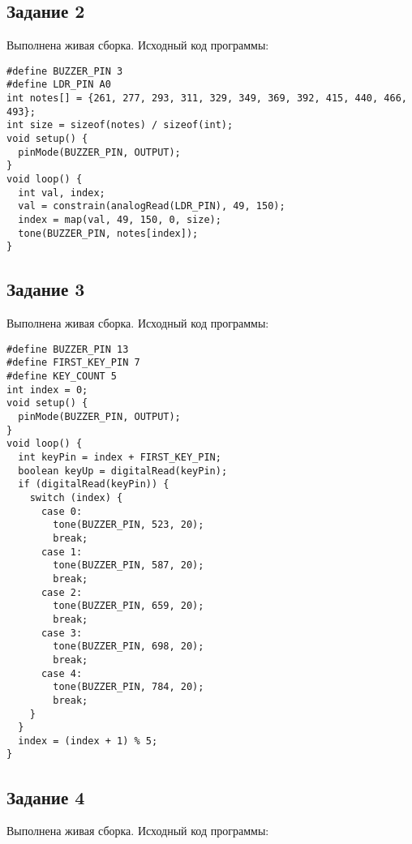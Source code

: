 \documentclass[a4paper,14pt]{extarticle}
\begin{document}
  \subsection*{\hspace{12.5mm}Задание 2}
  Выполнена живая сборка. Исходный код программы:

  \begingroup
    \fontsize{14pt}{10pt}\selectfont
    \linespread{1}
    \begin{verbatim}
#define BUZZER_PIN 3
#define LDR_PIN A0
int notes[] = {261, 277, 293, 311, 329, 349, 369, 392, 415, 440, 466, 493};
int size = sizeof(notes) / sizeof(int);
void setup() {
  pinMode(BUZZER_PIN, OUTPUT);
}
void loop() {
  int val, index;
  val = constrain(analogRead(LDR_PIN), 49, 150);
  index = map(val, 49, 150, 0, size);
  tone(BUZZER_PIN, notes[index]);
}
    \end{verbatim}
  \endgroup

  \subsection*{\hspace{12.5mm}Задание 3}
  Выполнена живая сборка. Исходный код программы:

  \begingroup
    \fontsize{14pt}{10pt}\selectfont
    \linespread{1}
    \begin{verbatim}
#define BUZZER_PIN 13
#define FIRST_KEY_PIN 7
#define KEY_COUNT 5
int index = 0;
void setup() {
  pinMode(BUZZER_PIN, OUTPUT);
}
void loop() {
  int keyPin = index + FIRST_KEY_PIN;
  boolean keyUp = digitalRead(keyPin);
  if (digitalRead(keyPin)) {
    switch (index) {
      case 0:
        tone(BUZZER_PIN, 523, 20);
        break;
      case 1:
        tone(BUZZER_PIN, 587, 20);
        break;
      case 2:
        tone(BUZZER_PIN, 659, 20);
        break;
      case 3:
        tone(BUZZER_PIN, 698, 20);
        break;
      case 4:
        tone(BUZZER_PIN, 784, 20);
        break;
    }
  }
  index = (index + 1) % 5;
}
    \end{verbatim}
  \endgroup

  \subsection*{\hspace{12.5mm}Задание 4}
  Выполнена живая сборка. Исходный код программы:
\end{document}
